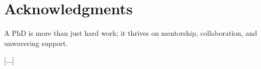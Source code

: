 \chapter*{Acknowledgments}

A PhD is more than just hard work; it thrives on mentorship, collaboration, and unwavering support.

[...]